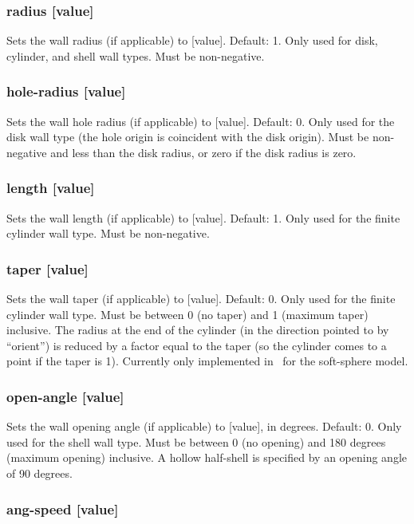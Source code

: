 \subsubsection{radius [value]}

Sets the wall radius (if applicable) to [value].  Default: 1.  Only
used for disk, cylinder, and shell wall types.  Must be non-negative.

\subsubsection{hole-radius [value]}

Sets the wall hole radius (if applicable) to [value].  Default: 0.
Only used for the disk wall type (the hole origin is coincident with
the disk origin).  Must be non-negative and less than the disk radius,
or zero if the disk radius is zero.

\subsubsection{length [value]}

Sets the wall length (if applicable) to [value].  Default: 1.  Only
used for the finite cylinder wall type.  Must be non-negative.

\subsubsection{taper [value]}

Sets the wall taper (if applicable) to [value].  Default: 0.  Only
used for the finite cylinder wall type.  Must be between 0 (no taper)
and 1 (maximum taper) inclusive.  The radius at the end of the
cylinder (in the direction pointed to by ``orient'') is reduced by a
factor equal to the taper (so the cylinder comes to a point if the
taper is 1).  Currently only implemented in \pkd\ for the soft-sphere
model.

\subsubsection{open-angle [value]}

Sets the wall opening angle (if applicable) to [value], in degrees.
Default: 0.  Only used for the shell wall type.  Must be between 0 (no
opening) and 180 degrees (maximum opening) inclusive.  A hollow
half-shell is specified by an opening angle of 90 degrees.

\subsubsection{ang-speed [value]}

